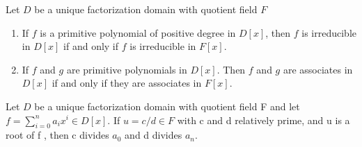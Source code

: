 \begin{corollary}
    Let $D$ be a unique factorization domain with quotient field $F$

    \begin{enumerate}
        \item
              If $f$ is a primitive polynomial of positive degree in $D[x]$,
              then $f$ is irreducible in $ D[ {x}]$ if and only if $f$ is irreducible in $ {F}[x]$.

        \item
              If $f$ and $g$ are primitive polynomials in $D[x]$. Then $f$ and $g$ are associates in $D[x]$ if and only if they are associates in $F[x]$.
    \end{enumerate}
\end{corollary}
\begin{theorem}
    Let $D$ be a unique factorization domain with quotient field F and let $f=\sum_{i=0}^n a_{i} x^{i} \in D[x]$. If $u=c / d \in F$ with c and d relatively prime, and u is a root of f , then c divides $a_0$ and d divides $a_{n}$.
\end{theorem}

